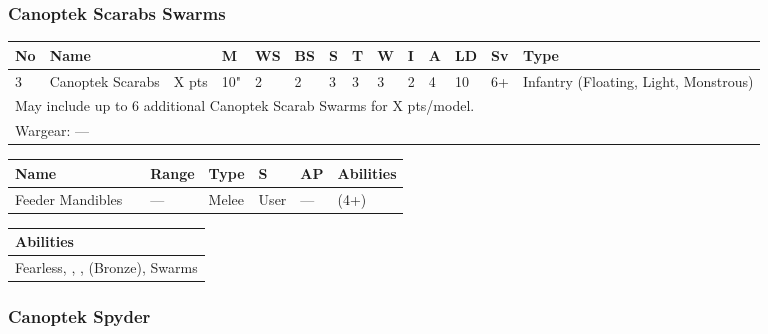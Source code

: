 \newpage
\subsubsection{Canoptek Scarabs Swarms}

\noindent
\begin{tabular}{||m{10pt} m{95pt} m{30pt} m{11pt} m{11pt} m{11pt} m{11pt} m{11pt} m{11pt} m{11pt} m{11pt} m{11pt} m{11pt} m{125pt}||}
	\hline
	No & Name & & M & WS & BS & S & T & W & I & A & LD & Sv & Type \\
	\hline
	3 & Canoptek Scarabs & X pts & 10" & 2 & 2 & 3 & 3 & 3 & 2 & 4 & 10 & 6+ & Infantry (Floating, Light, Monstrous)\\
	\hline
	\hline
	\multicolumn{14}{||Z{532 pt}||}{May include up to 6 additional Canoptek Scarab Swarms for X pts/model.}\\		
	\hline
	\hline
	\multicolumn{14}{||Z{532 pt}||}{Wargear: —}\\
	\hline
\end{tabular}

\noindent
\begin{tabular}{||m{110pt} m{30pt} m{31pt} m{55pt} m{12pt} m{12pt} m{210pt}||}
	\hline
	Name & & Range & Type & S & AP & Abilities \\
	\hline
	Feeder Mandibles & & — & Melee & User & — & \quickref{Entropic Strike} (4+) \\
	\hline
\end{tabular}

\noindent
\begin{tabular}{||m{532pt}||}
	\hline
	Abilities \\
	\hline
	Fearless, \quickref{Living Metal}, \quickref{Reanimation Protocols}, \quickref{Soulless Hordes} (Bronze), Swarms \\
	\hline
\end{tabular}


\newpage
\subsubsection{Canoptek Spyder}

